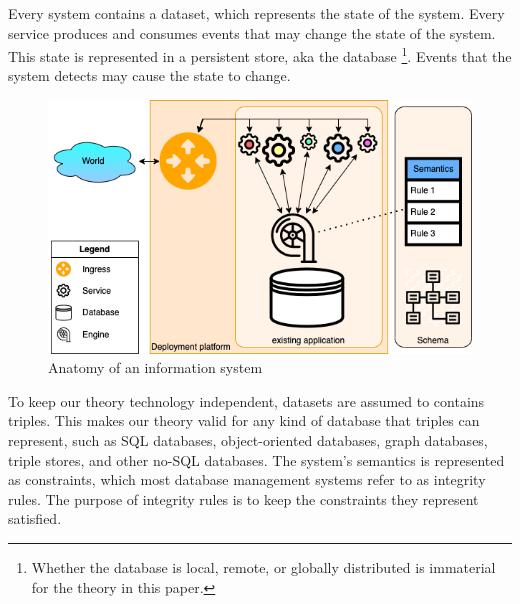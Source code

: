 \documentclass{elsarticle}
\begin{document}
   Every system contains a dataset, which represents the state of the system.
   Every service produces and consumes events that may change the state of the system.
   This state is represented in a persistent store, aka the database%
\footnote{Whether the database is local, remote, or globally distributed is immaterial for the theory in this paper.}.
   Events that the system detects may cause the state to change.
\begin{figure}[bht]
   \begin{center}
     \includegraphics[scale=.45]{datamigration-Pre-migration.drawio.png}
   \end{center}
\caption{Anatomy of an information system}
\label{fig:pre-migration}
\end{figure}
   To keep our theory technology independent, datasets are assumed to contains triples.
   This makes our theory valid for any kind of database that triples can represent,
   such as SQL databases, object-oriented databases, graph databases, triple stores, and other no-SQL databases.
   The system's semantics is represented as constraints,
   which most database management systems refer to as integrity rules.
   The purpose of integrity rules is to keep the constraints they represent satisfied.
\end{document}
